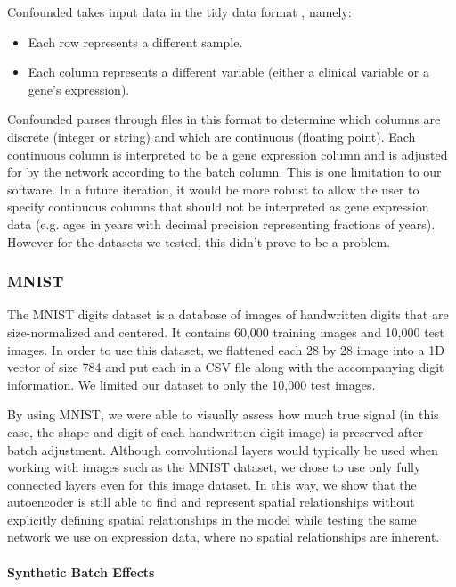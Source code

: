 \documentclass[notitlepage]{article}
\begin{document}
Confounded takes input data in the tidy data format \cite{wickham_tidy_2014-1}, namely:

\begin{itemize}
	\item Each row represents a different sample.
	\item Each column represents a different variable (either a clinical variable or a gene's expression).
\end{itemize}

Confounded parses through files in this format to determine which columns are discrete (integer or string) and which are continuous (floating point).
Each continuous column is interpreted to be a gene expression column and is adjusted for by the network according to the batch column.
This is one limitation to our software.
In a future iteration, it would be more robust to allow the user to specify continuous columns that should not be interpreted as gene expression data (e.g. ages in years with decimal precision representing fractions of years).
However for the datasets we tested, this didn't prove to be a problem.

\subsubsection{MNIST}

The MNIST digits dataset \cite{lecun_mnist_nodate} is a database of images of handwritten digits that are size-normalized and centered.
It contains 60,000 training images and 10,000 test images.
In order to use this dataset, we flattened each 28 by 28 image into a 1D vector of size 784 and put each in a CSV file along with the accompanying digit information.
We limited our dataset to only the 10,000 test images.

By using MNIST, we were able to visually assess how much true signal (in this case, the shape and digit of each handwritten digit image) is preserved after batch adjustment.
Although convolutional layers would typically be used when working with images such as the MNIST dataset, we chose to use only fully connected layers even for this image dataset.
In this way, we show that the autoencoder is still able to find and represent spatial relationships without explicitly defining spatial relationships in the model while testing the same network we use on expression data, where no spatial relationships are inherent.

\paragraph{Synthetic Batch Effects}
\end{document}
